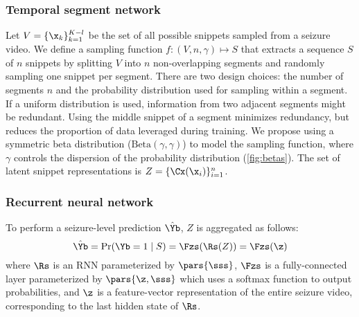 \subsubsection{Temporal segment network}
Let $V = \{ \x_k \}_{k=1}^{K-l}$ be the set of all possible snippets sampled from a seizure video.
We define a sampling function $f : (V, n, \gamma) \mapsto S$ that extracts a sequence $S$ of $n$ snippets by splitting $V$ into $n$ non-overlapping segments and randomly sampling one snippet per segment.
There are two design choices: the number of segments $n$ and the probability distribution used for sampling within a segment.
If a uniform distribution is used,
information from two adjacent segments might be redundant.
Using the middle snippet of a segment minimizes redundancy, but reduces the proportion of data leveraged during training.
We propose using a symmetric beta distribution ($\text{Beta}(\gamma, \gamma)$) to model the sampling function,
where $\gamma$ controls the dispersion of the probability distribution (\cref{fig:betas}).
The set of latent snippet representations is $Z = \{ \Cx (\x_i) \}_{i = 1}^{n}$.


\subsubsection{Recurrent neural network}

To perform a seizure-level prediction $\hat{\Yb}$, $Z$ is aggregated as follows:
\begin{equation}
    \hat{\Yb}
    = \Pr(\Yb = 1 \mid S)
    = \Fzs( \Rs ( Z ) )
    = \Fzs( \z )
\end{equation}
where
$\Rs$ is an \ac{RNN} parameterized by $\pars{\sss}$,
$\Fzs$ is a fully-connected layer parameterized by $\pars{\z,\sss}$ which uses a softmax function to output probabilities,
and $\z$ is a feature-vector representation of the entire seizure video, corresponding to the last hidden state of $\Rs$.
